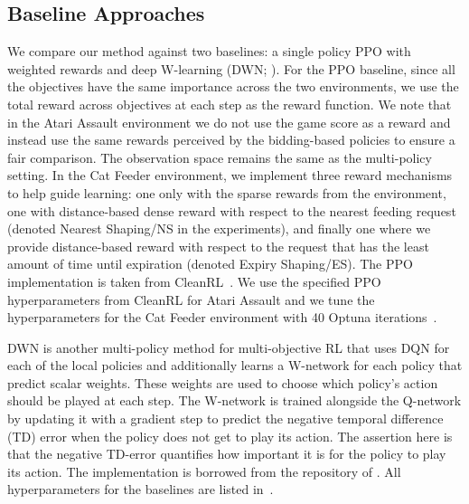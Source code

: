 \subsection{Baseline Approaches}

We compare our method against two baselines: a single policy PPO with weighted rewards and deep W-learning (DWN; \citet{rosero2024multi}). 
For the PPO baseline, since all the objectives have the same importance across the two environments, we use the total reward across objectives at each step as the reward function.
We note that in the Atari Assault environment we do not use the game score as a reward and instead use the same rewards perceived by the bidding-based policies to ensure a fair comparison.
The observation space remains the same as the multi-policy setting. 
In the Cat Feeder environment, we implement three reward mechanisms to help guide learning: one only with the sparse rewards from the environment, one with distance-based dense reward with respect to the nearest feeding request (denoted Nearest Shaping/NS in the experiments), and finally one where we provide distance-based reward with respect to the request that has the least amount of time until expiration (denoted Expiry Shaping/ES).
The PPO implementation is taken from CleanRL~\citep{huang2022cleanrl}.
We use the specified PPO hyperparameters from CleanRL for Atari Assault and we tune the hyperparameters for the Cat Feeder environment with 40 Optuna iterations~\citep{akiba2019optuna}.

DWN is another multi-policy method for multi-objective RL that uses DQN for each of the local policies and additionally learns a W-network for each policy that predict scalar weights. 
These weights are used to choose which policy's action should be played at each step. 
The W-network is trained alongside the Q-network by updating it with a gradient step to predict the negative temporal difference (TD) error when the policy does not get to play its action.
The assertion here is that the negative TD-error quantifies how important it is for the policy to play its action. 
The implementation is borrowed from the repository of \citet{rosero2024multi}. All hyperparameters for the baselines are listed in~.